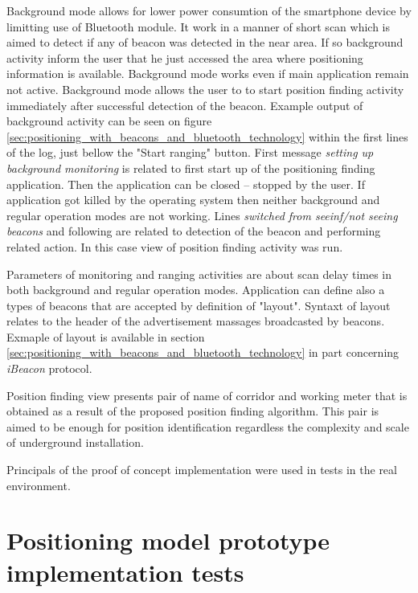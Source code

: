 \documentclass[../main.tex]{subfiles}
\begin{document}
Background mode allows for lower power consumtion of the smartphone device by limitting use of Bluetooth module. It work in a manner of short scan which is aimed to detect if any of beacon was detected in the near area. If so background activity inform the user that he just accessed the area where positioning information is available. Background mode works even if main application remain not active. Background mode allows the user to to start position finding activity immediately after successful detection of the beacon. Example output of background activity can be seen on figure \ref{sec:positioning_with_beacons_and_bluetooth_technology} within the first lines of the log, just bellow the "Start ranging" button. First message \textit{setting up background monitoring} is related to first start up of the positioning finding application. Then the application can be closed -- stopped by the user. If application got killed by the operating system then neither background and regular operation modes are not working. Lines \textit{switched from seeinf/not seeing beacons} and following are related to detection of the beacon and performing related action. In this case view of position finding activity was run.

Parameters of monitoring and ranging activities are about scan delay times in both background and regular operation modes. Application can define also a types of beacons that are accepted by definition of "layout". Syntaxt of layout relates to the header of the advertisement massages broadcasted by beacons. Exmaple of layout is available in section \ref{sec:positioning_with_beacons_and_bluetooth_technology} in part concerning \textit{iBeacon} protocol.

Position finding view presents pair of name of corridor and working meter that is obtained as a result of the proposed position finding algorithm. This pair is aimed to be enough for position identification regardless the complexity and scale of underground installation.

Principals of the proof of concept implementation were used in tests in the real environment.


\chapter{Positioning model prototype implementation tests}
\label{ch:localization_system_tests}
\end{document}
